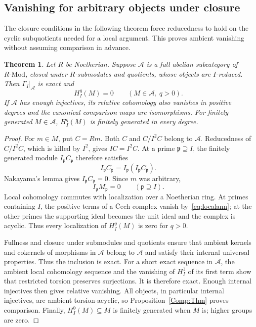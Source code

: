 \documentclass[11pt,reqno]{amsart}
\newtheorem{theorem}{Theorem}[section]
\theoremstyle{definition}
\theoremstyle{remark}
\newcommand{\Mod}{\text{-}\mathrm{Mod}}
\begin{document}
\subsection{Vanishing for arbitrary objects under closure}
The closure conditions in the following theorem force reducedness to hold on the cyclic subquotients needed for a local argument. This proves ambient vanishing without assuming comparison in advance.
\begin{theorem}\label{thm:vanish}
Let $R$ be Noetherian. Suppose $\mathcal A$ is a full abelian subcategory of $R\Mod$, closed under $R$-submodules and quotients, whose objects are $I$-reduced. Then $\Gamma_I|_{\mathcal A}$ is exact and
\[
H_I^q(M)=0\qquad(M\in\mathcal A,\ q>0).
\]
If $\mathcal A$ has enough injectives, its relative cohomology also vanishes in positive degrees and the canonical comparison maps are isomorphisms. For finitely generated $M\in\mathcal A$, $H_I^q(M)$ is finitely generated in every degree.
\end{theorem}
\begin{proof}
For $m\in M$, put $C=Rm$. Both $C$ and $C/I^2C$ belong to $\mathcal A$. Reducedness of $C/I^2C$, which is killed by $I^2$, gives $IC=I^2C$. At a prime $\mathfrak p\supseteq I$, the finitely generated module $I_{\mathfrak p}C_{\mathfrak p}$ therefore satisfies
\[
I_{\mathfrak p}C_{\mathfrak p}=I_{\mathfrak p}(I_{\mathfrak p}C_{\mathfrak p}).
\]
Nakayama's lemma gives $I_{\mathfrak p}C_{\mathfrak p}=0$. Since $m$ was arbitrary,
\begin{equation}\label{eq:localann}
I_{\mathfrak p}M_{\mathfrak p}=0\qquad(\mathfrak p\supseteq I).
\end{equation}
Local cohomology commutes with localization over a Noetherian ring. At primes containing $I$, the positive terms of a \v{C}ech complex vanish by~\eqref{eq:localann}; at the other primes the supporting ideal becomes the unit ideal and the complex is acyclic. Thus every localization of $H_I^q(M)$ is zero for $q>0$.

Fullness and closure under submodules and quotients ensure that ambient kernels and cokernels of morphisms in $\mathcal A$ belong to $\mathcal A$ and satisfy their internal universal properties. Thus the inclusion is exact. For a short exact sequence in $\mathcal A$, the ambient local cohomology sequence and the vanishing of $H_I^1$ of its first term show that restricted torsion preserves surjections. It is therefore exact. Enough internal injectives then gives relative vanishing. All objects, in particular internal injectives, are ambient torsion-acyclic, so Proposition~\ref{Comp:Thm} proves comparison. Finally, $H_I^0(M)\subseteq M$ is finitely generated when $M$ is; higher groups are zero.
\end{proof}
\end{document}
